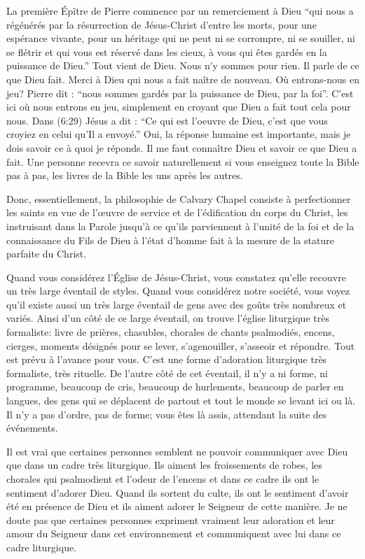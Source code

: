 La première Épître de Pierre commence par un remerciement à Dieu “qui nous a régénérés par la résurrection de
Jésus-Christ d’entre les morts, pour une espérance vivante, pour un héritage qui ne peut ni se corrompre, ni se
souiller, ni se flétrir et qui vous est réservé dans les cieux, à vous qui êtes gardés en la puissance de Dieu.” Tout vient
de Dieu. Nous n’y sommes pour rien. Il parle de ce que Dieu fait. Merci à Dieu qui nous a fait naître de nouveau. Où
entrons-nous en jeu? Pierre dit : “nous sommes gardés par la puissance de Dieu, par la foi”. C’est ici où nous entrons
en jeu, simplement en croyant que Dieu a fait tout cela pour nous. Dans (6:29) Jésus a dit : “Ce qui est l’oeuvre
de Dieu, c’est que vous croyiez en celui qu’Il a envoyé.” Oui, la réponse humaine est importante, mais je dois savoir
ce à quoi je réponds. Il me faut connaître Dieu et savoir ce que Dieu a fait. Une personne recevra ce savoir
naturellement si vous enseignez toute la Bible pas à pas, les livres de la Bible les uns après les autres.

Donc, essentiellement, la philosophie de Calvary Chapel consiste à perfectionner les saints en vue de l’œuvre de
service et de l’édification du corps du Christ, les instruisant dans la Parole jusqu’à ce qu’ils parviennent à l’unité de la
foi et de la connaissance du Fils de Dieu à l’état d’homme fait à la mesure de la stature parfaite du Christ.

Quand vous considérez l’Église de Jésus-Christ, vous constatez qu’elle recouvre un très large éventail de styles. Quand
vous considérez notre société, vous voyez qu’il existe aussi un très large éventail de gens avec des goûts très
nombreux et variés. Ainsi d’un côté de ce large éventail, on trouve l’église liturgique très formaliste: livre de prières,
chasubles, chorales de chants psalmodiés, encens, cierges, moments désignés pour se lever, s’agenouiller, s’asseoir et
répondre. Tout est prévu à l’avance pour vous. C’est une forme d’adoration liturgique très formaliste, très rituelle. De
l’autre côté de cet éventail, il n’y a ni forme, ni programme, beaucoup de cris, beaucoup de hurlements, beaucoup de
parler en langues, des gens qui se déplacent de partout et tout le monde se levant ici ou là. Il n’y a pas d’ordre, pas
de forme; vous êtes là assis, attendant la suite des événements.

Il est vrai que certaines personnes semblent ne pouvoir communiquer avec Dieu que dans un cadre très liturgique. Ils
aiment les froissements de robes, les chorales qui psalmodient et l’odeur de l’encens et dans ce cadre ils ont le
sentiment d’adorer Dieu. Quand ils sortent du culte, ils ont le sentiment d’avoir été en présence de Dieu et ils aiment
adorer le Seigneur de cette manière. Je ne doute pas que certaines personnes expriment vraiment leur adoration et
leur amour du Seigneur dans cet environnement et communiquent avec lui dans ce cadre liturgique.

